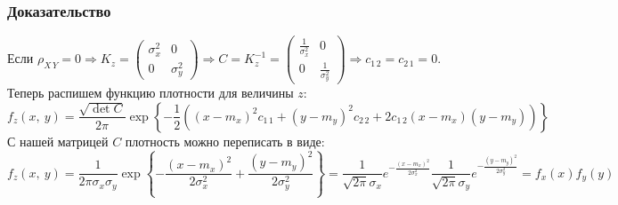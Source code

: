 \documentclass[12pt, a4paper]{article}
\begin{document}
\subsubsection*{Доказательство}
Если $\rho_{X\, Y} = 0 \Rightarrow K_z = \begin{pmatrix}
    \sigma_x^2 & 0\\
    0 & \sigma_y^2
\end{pmatrix} \Rightarrow C = K_{z}^{-1} = \begin{pmatrix}
    \frac{1}{\sigma_x^2} & 0\\
    0 & \frac{1}{\sigma_y^2}
\end{pmatrix} \Rightarrow c_{1\, 2} = c_{2\, 1} = 0$.\\
Теперь распишем функцию плотности для величины $z$:
\[f_z(x,\ y) = \frac{\sqrt{\det C}}{ 2\pi} \exp \left\{ -\frac{1}{2} \left( {\left( x - m_x \right)}^2 c_{1\, 1} + {\left( y - m_y \right)}^2 c_{2\, 2} + 2c_{1\, 2} (x - m_x)(y - m_y) \right) \right\}\]
С нашей матрицей $C$ плотность можно переписать в виде:
\[f_z(x,\ y) = \frac{1}{2\pi \sigma_x \sigma_y} \exp \left\{ -\frac{{(x - m_x)}^2}{2\sigma_x^2} + \frac{ {\left( y - m_y \right)}^2 }{2\sigma_y^2} \right\} = \frac{1}{\sqrt{2\pi} \sigma_x} e^{-\frac{ {\left( x - m_x \right)}^2 }{2\sigma^2_x}} \frac{1}{\sqrt{2\pi} \sigma_y} e^{ -\frac{ {\left( y - m_y \right)}^2 }{2\sigma^2_y} } = f_x(x) f_y(y)\]
\end{document}
